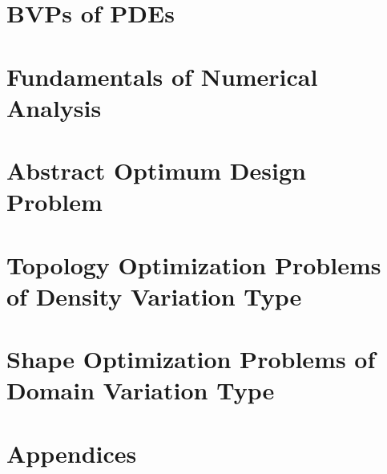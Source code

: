 \documentclass[oneside]{book}
\numberwithin{equation}{section}
\begin{document}
\section{BVPs of PDEs}


\section{Fundamentals of Numerical Analysis}


\section{Abstract Optimum Design Problem}


\section{Topology Optimization Problems of Density Variation Type}


\section{Shape Optimization Problems of Domain Variation Type}


\section{Appendices}


\printbibliography[heading=bibintoc]
	
\end{document}
